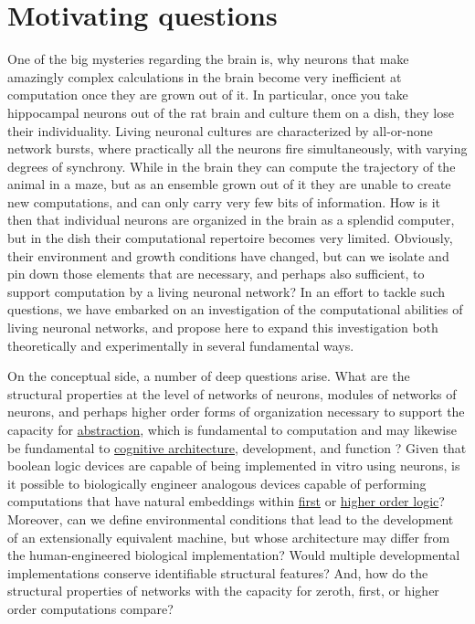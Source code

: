 \section{Motivating questions}

One of the big mysteries regarding the brain is, why neurons that make amazingly complex calculations in the brain become very inefficient at computation once they are grown out of it. In particular, once you take hippocampal neurons out of the rat brain and culture them on a dish, they lose their individuality. Living neuronal cultures are characterized by all-or-none network bursts, where practically all the neurons fire simultaneously, with varying degrees of synchrony. While in the brain they can compute the trajectory of the animal in a maze, but as an ensemble grown out of it they are unable to create new computations, and can only carry very few bits of information. How is it then that individual neurons are organized in the brain as a splendid computer, but in the dish their computational repertoire becomes very limited. Obviously, their environment and growth conditions have changed, but can we isolate and pin down those elements that are necessary, and perhaps also sufficient, to support computation by a living neuronal network? In an effort to tackle such questions, we have embarked on an investigation of the computational abilities of living neuronal networks, and propose here to expand this investigation both theoretically and experimentally in several fundamental ways.

On the conceptual side, a number of deep questions arise. What are the structural properties at the level of networks of neurons,
modules of networks of neurons, and perhaps higher order forms of
organization necessary to support the capacity for
\href{http://en.wikipedia.org/wiki/Metalinguistic\_abstraction}{abstraction},
which is fundamental to computation and may likewise be fundamental to
\href{http://en.wikipedia.org/wiki/Cognitive\_architecture}{cognitive
architecture}, development, and function \cite{Tenenbaum2011}? Given that boolean
logic devices are capable of being implemented in vitro using
neurons\cite{Feinerman2008}, is it possible to biologically engineer analogous
devices capable of performing computations that have natural embeddings
within \href{http://en.wikipedia.org/wiki/First-order\_logic}{first} or
\href{http://en.wikipedia.org/wiki/Higher\_order\_logic}{higher order
logic}? Moreover, can we define environmental conditions that lead to
the development of an extensionally equivalent machine, but whose
architecture may differ from the human-engineered biological
implementation? Would multiple developmental implementations conserve
identifiable structural features? And, how do the structural properties
of networks with the capacity for zeroth, first, or higher order
computations compare?

